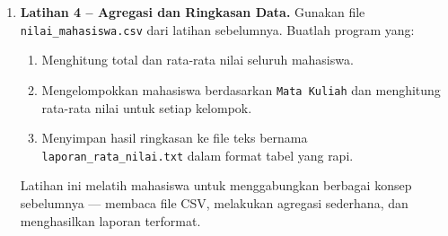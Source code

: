\begin{enumerate}
Tujuan latihan ini adalah agar mahasiswa terbiasa bekerja dengan format CSV dan memahami perbedaan antara pembacaan berbasis daftar dan berbasis kamus.

\noindent\textbf{Contoh isi file input \texttt{nilai\_mahasiswa.csv}:}

Listing~\ref{lst:b7-nilai-mahasiswa-2} menampilkan contoh keluarannya.

\begin{lstlisting}[language=bash, caption={Cuplikan isi file nilai_mahasiswa.csv}, label={lst:b7-nilai-mahasiswa-2}]
Nama,Mata Kuliah,Nilai
Andi,Algoritma,85
Budi,Algoritma,90
Citra,Struktur Data,78
Dewi,Algoritma,88
Eko,Struktur Data,92
Fani,Basis Data,75
Gilang,Basis Data,81
\end{lstlisting}

\noindent\textbf{Contoh hasil file output \texttt{mahasiswa\_unggul.csv}:}

Listing~\ref{lst:b7-mahasiswa-unggul} menampilkan contoh keluarannya.

\begin{lstlisting}[language=bash, caption={Isi file mahasiswa_unggul.csv yang dihasilkan}, label={lst:b7-mahasiswa-unggul}]
Nama,Mata Kuliah,Nilai
Andi,Algoritma,85
Budi,Algoritma,90
Dewi,Algoritma,88
Eko,Struktur Data,92
Gilang,Basis Data,81
\end{lstlisting}


      \begin{promptterarah}
      Saya sedang membaca dan menulis nilai\_mahasiswa.csv dengan DictReader dan DictWriter. Jangan tuliskan kodenya. Tanyakan bentuk data setiap baris yang dihasilkan DictReader, lalu jelaskan bila jawaban saya keliru. Setelah saya mengirim kode, periksa dan tunjukkan bagian yang keliru tanpa memberi kode yang benar.
      \end{promptterarah}
    \item \textbf{Latihan 4 – Agregasi dan Ringkasan Data.}  
Gunakan file \texttt{nilai\_mahasiswa.csv} dari latihan sebelumnya.  
Buatlah program yang:
\begin{enumerate}
    \item Menghitung total dan rata-rata nilai seluruh mahasiswa.  
    \item Mengelompokkan mahasiswa berdasarkan \texttt{Mata Kuliah} dan menghitung rata-rata nilai untuk setiap kelompok.  
    \item Menyimpan hasil ringkasan ke file teks bernama \texttt{laporan\_rata\_nilai.txt} dalam format tabel yang rapi.  
\end{enumerate}
Latihan ini melatih mahasiswa untuk menggabungkan berbagai konsep sebelumnya — membaca file CSV, melakukan agregasi sederhana, dan menghasilkan laporan terformat.


\end{enumerate}
